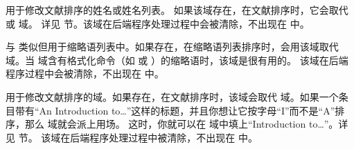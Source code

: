\begin{fieldlist}

用于修改文献排序的姓名或姓名列表。
如果该域存在，在文献排序时，它会取代   或  域。
详见  节。该域在后端程序处理过程中会被清除，不出现在  中。




与  类似但用于缩略语列表中。如果存在，在缩略语列表排序时，\biblatex 会用该域取代  域。当  域含有格式化命令（如  或 ）的缩略语时，该域是很有用的。
该域在后端程序过程中会被清除，不出现在  中。



用于修改文献排序的域。如果存在，在文献排序时，该域会取代  域。如果一个条目带有“An Introduction to\dots”这样的标题，并且你想让它按字母“I”而不是“A”排序，那么  域就会派上用场。
这时，你就可以在  域中填上“Introduction to\dots”。详见  节。
该域在后端程序处理过程中被清除，不出现在  中。




\end{fieldlist}
